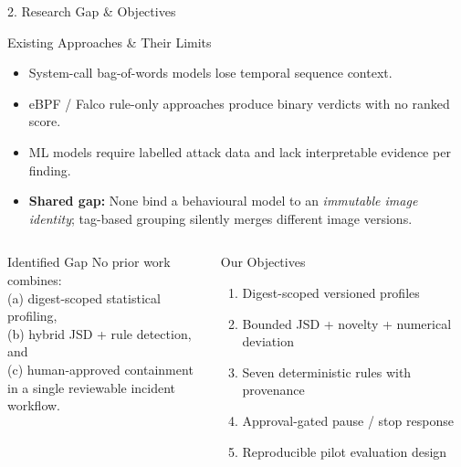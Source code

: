 \documentclass[aspectratio=169,10pt]{beamer}
\begin{document}
\begin{frame}{2. Research Gap \& Objectives}
\small

\begin{block}{Existing Approaches \& Their Limits}
\begin{itemize}
  \item System-call bag-of-words models lose temporal sequence context.
  \item eBPF / Falco rule-only approaches produce binary verdicts with no ranked score.
  \item ML models require labelled attack data and lack interpretable evidence per finding.
  \item \textbf{Shared gap:} None bind a behavioural model to an \emph{immutable image identity}; tag-based grouping silently merges different image versions.
\end{itemize}
\end{block}

\vspace{0.2cm}

\begin{columns}[T,onlytextwidth]
\begin{alertblock}{Identified Gap}
No prior work combines:\\
(a) digest-scoped statistical profiling,\\
(b) hybrid JSD + rule detection, and\\
(c) human-approved containment\\
in a single reviewable incident workflow.
\end{alertblock}

\begin{block}{Our Objectives}
\begin{enumerate}\setlength{\itemsep}{3pt}
  \item Digest-scoped versioned profiles
  \item Bounded JSD + novelty + numerical deviation
  \item Seven deterministic rules with provenance
  \item Approval-gated pause / stop response
  \item Reproducible pilot evaluation design
\end{enumerate}
\end{block}
\end{columns}
\end{frame}
\end{document}
